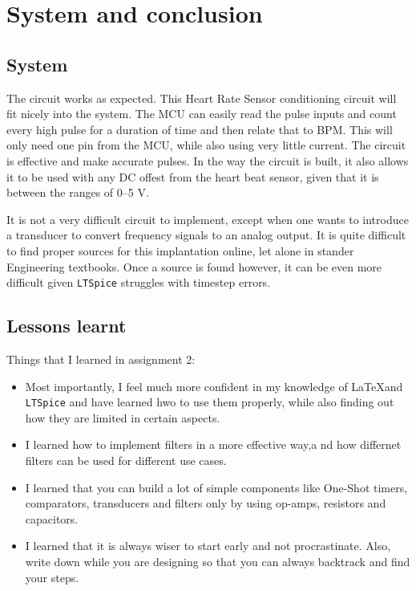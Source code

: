 \chapter{System and conclusion}
\vspace{-5mm}
\section{System}
The circuit works as expected. This Heart Rate Sensor conditioning circuit will fit nicely into the system. The MCU can easily read the pulse inputs and count every high pulse for a duration of time and then relate that to BPM. This will only need one pin from the MCU, while also using very little current. The circuit is effective and make accurate pulses. In the way the circuit is built, it also allows it to be used with any DC offest from the heart beat sensor, given that it is between the ranges of \numrange{0}{5} \si{\volt}.\par
It is not a very difficult circuit to implement, except when one wants to introduce a transducer to convert frequency signals to an analog output. It is quite difficult to find proper sources for this implantation online, let alone in stander Engineering textbooks. Once a source is found however, it can be even more difficult given \texttt{LTSpice} struggles with timestep errors.


\section{Lessons learnt}
Things that I learned in assignment 2:
\begin{itemize}
    \item Most importantly, I feel much more confident in my knowledge of \LaTeX and \texttt{LTSpice} and have learned hwo to use them properly, while also finding out how they are limited in certain aspects.
    \item I learned how to implement filters in a more effective way,a nd how differnet filters can be used for different use cases.
    \item I learned that you can build a lot of simple components like One-Shot timers, comparators, transducers and filters only by using op-amps, resistors and capacitors.
    \item I learned that it is always wiser to start early and not procrastinate. Also, write down while you are designing so that you can always backtrack and find your steps. 
\end{itemize}


